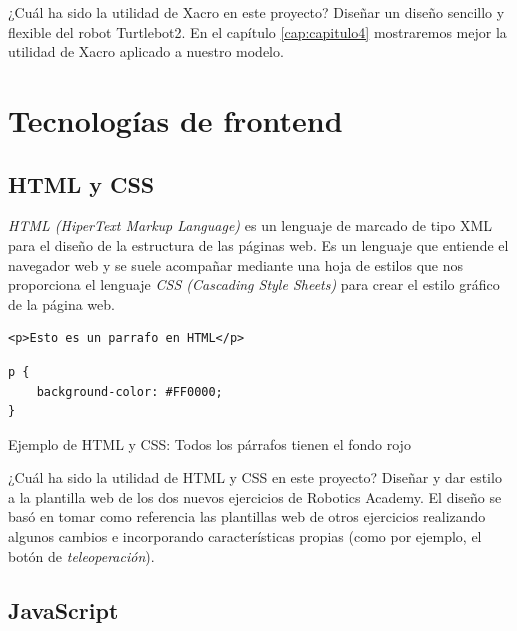 ¿Cuál ha sido la utilidad de Xacro en este proyecto? Diseñar un diseño sencillo y flexible del robot Turtlebot2. En el capítulo \ref{cap:capitulo4} mostraremos mejor la utilidad de Xacro aplicado a nuestro modelo.\\



\section{Tecnologías de frontend}
\label{sec:tecnologias_frontend}

\subsection{HTML y CSS}
\label{subsec:html_css}

\textit{HTML (HiperText Markup Language)} es un lenguaje de marcado de tipo XML para el diseño de la estructura de las páginas web. Es un lenguaje que entiende el navegador web y se suele acompañar mediante una hoja de estilos que nos proporciona el lenguaje \textit{CSS (Cascading Style Sheets)} para crear el estilo gráfico de la página web.\\


\begin{code}[H]
\begin{lstlisting}
<p>Esto es un parrafo en HTML</p>
\end{lstlisting}
\begin{lstlisting}
p {
	background-color: #FF0000;
}
\end{lstlisting}
\caption[Ejemplo de HTML y CSS]{Ejemplo de HTML y CSS: Todos los párrafos tienen el fondo rojo}
\label{cod:codigo_urdf}
\end{code}

¿Cuál ha sido la utilidad de HTML y CSS en este proyecto? Diseñar y dar estilo a la plantilla web de los dos nuevos ejercicios de Robotics Academy. El diseño se basó en tomar como referencia las plantillas web de otros ejercicios realizando algunos cambios e incorporando características propias (como por ejemplo, el botón de \textit{teleoperación}).\\




\subsection{JavaScript}
\label{subsec:JavaScript}

